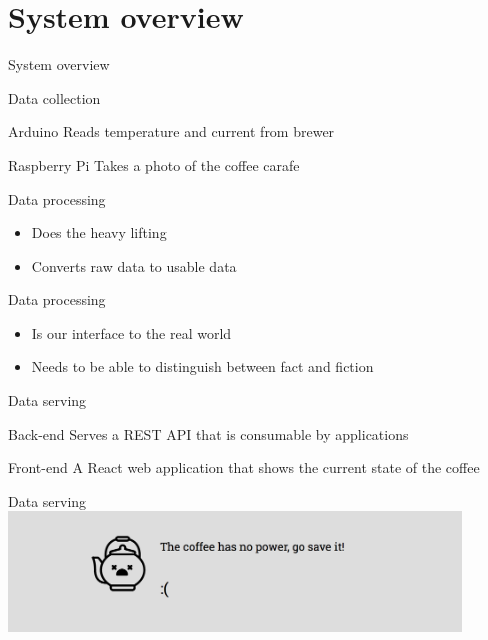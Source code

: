 \documentclass[presentation]{beamer}
\begin{document}
\section{System overview}
\label{sec:orgfdedcbc}
\begin{frame}[label={sec:orgb2e56b3}]{System overview}
\begin{adjustbox}{max totalsize={.9\textwidth}{.7\textheight},center}
  
\end{adjustbox}
\end{frame}
\begin{frame}[label={sec:orgab2493b}]{Data collection}
\begin{block}{Arduino}
Reads temperature and current from brewer
\end{block}
\begin{block}{Raspberry Pi}
Takes a photo of the coffee carafe
\end{block}
\end{frame}
\begin{frame}[label={sec:orgfa3311b}]{Data processing}
\begin{itemize}
\item Does the heavy lifting
\item Converts raw data to usable data
\end{itemize}
\end{frame}
\begin{frame}[label={sec:org0473935}]{Data processing}
\begin{itemize}
\item Is our interface to the real world
\item Needs to be able to distinguish between fact and fiction
\end{itemize}
\end{frame}
\begin{frame}[label={sec:orgb38fb0c}]{Data serving}
\begin{block}{Back-end}
Serves a REST API that is consumable by applications
\end{block}
\begin{block}{Front-end}
A React web application that shows the current state of the coffee
\end{block}
\end{frame}
\begin{frame}[label={sec:org62541be}]{Data serving}
\includegraphics[width=0.9\textwidth]{figures/nopower}
\end{frame}
\end{document}
